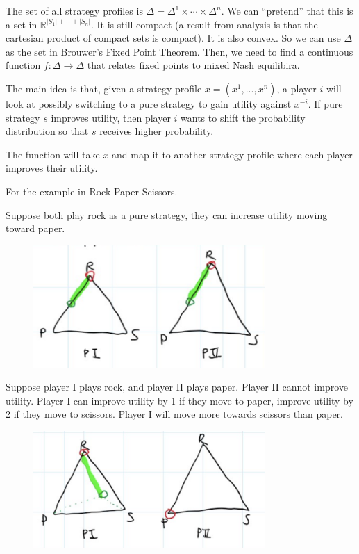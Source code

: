 \documentclass[twoside]{article}
\begin{document}
The set of all strategy profiles is $\Delta = \Delta^1 \times \cdots \times \Delta^n$. We can ``pretend'' that this is a set in $\mathbb{R}^{|S_1| + \cdots + |S_n|}$. It is still compact (a result from analysis is that the cartesian product of compact sets is compact). It is also convex. So we can use $\Delta$ as the set in Brouwer's Fixed Point Theorem. Then, we need to find a continuous function $f: \Delta \rightarrow \Delta $ that relates fixed points to mixed Nash equilibira. 

The main idea is that, given a strategy profile $x = (x^1, ..., x^n)$, a player $i$ will look at possibly switching to a pure strategy to gain utility against $x^{-i}$. If pure strategy $s$ improves utility, then player $i$ wants to shift the probability distribution so that $s$ receives higher probability. 

The function will take $x$ and map it to another strategy profile where each player improves their utility. 

For the example in Rock Paper Scissors. 
	
Suppose both play rock as a pure strategy, they can increase utility moving toward paper. 
\begin{center}
	\begin{figure}[h!]
		\includegraphics[width=250pt]{Rock_Paper_Scissors_1.png}
	\end{figure}
\end{center}
\newpage
Suppose player I plays rock, and player II plays paper. Player II cannot improve utility. Player I can improve utility by 1 if they move to paper, improve utility by 2 if they move to scissors. Player I will move more towards scissors than paper. 
\begin{center}
	\begin{figure}[h!]
		\includegraphics[width=250pt]{Rock_Paper_Scissors_2.png}
	\end{figure}
\end{center}
\end{document}

